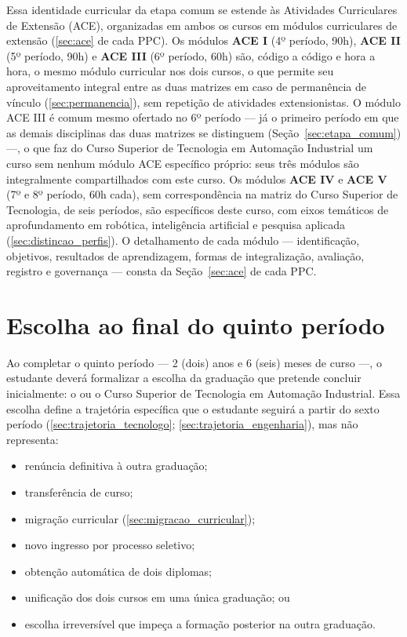 Essa identidade curricular da etapa comum se estende às Atividades Curriculares de Extensão (ACE), organizadas em ambos os cursos em módulos curriculares de extensão (\autoref{sec:ace} de cada PPC). Os módulos \textbf{ACE I} (4º período, 90h), \textbf{ACE II} (5º período, 90h) e \textbf{ACE III} (6º período, 60h) são, código a código e hora a hora, o mesmo módulo curricular nos dois cursos, o que permite seu aproveitamento integral entre as duas matrizes em caso de permanência de vínculo (\autoref{sec:permanencia}), sem repetição de atividades extensionistas. O módulo ACE III é comum mesmo ofertado no 6º período — já o primeiro período em que as demais disciplinas das duas matrizes se distinguem (Seção~\ref{sec:etapa_comum}) —, o que faz do Curso Superior de Tecnologia em Automação Industrial um curso sem nenhum módulo ACE específico próprio: seus três módulos são integralmente compartilhados com este curso. Os módulos \textbf{ACE IV} e \textbf{ACE V} (7º e 8º período, 60h cada), sem correspondência na matriz do Curso Superior de Tecnologia, de seis períodos, são específicos deste curso, com eixos temáticos de aprofundamento em robótica, inteligência artificial e pesquisa aplicada (\autoref{sec:distincao_perfis}). O detalhamento de cada módulo — identificação, objetivos, resultados de aprendizagem, formas de integralização, avaliação, registro e governança — consta da Seção~\ref{sec:ace} de cada PPC.

\section{Escolha ao final do quinto período}
\label{sec:escolha}

Ao completar o quinto período — 2 (dois) anos e 6 (seis) meses de curso —, o estudante deverá formalizar a escolha da graduação que pretende concluir inicialmente: o \ppccurso ou o Curso Superior de Tecnologia em Automação Industrial. Essa escolha define a trajetória específica que o estudante seguirá a partir do sexto período (\autoref{sec:trajetoria_tecnologo}; \autoref{sec:trajetoria_engenharia}), mas não representa:

\begin{itemize}
    \item renúncia definitiva à outra graduação;
    \item transferência de curso;
    \item migração curricular (\autoref{sec:migracao_curricular});
    \item novo ingresso por processo seletivo;
    \item obtenção automática de dois diplomas;
    \item unificação dos dois cursos em uma única graduação; ou
    \item escolha irreversível que impeça a formação posterior na outra graduação.
\end{itemize}

